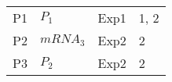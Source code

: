 

\begin{center}
\label{3_node_prediction}
\begin{scriptsize}
\begin{supertabular}{|p{2cm}|p{3cm}|p{3cm}|p{3cm}|}  
\hline											
P1 &  $P_{1}$ & Exp1 & 1, 2 \\
P2 &  $mRNA_{3}$  & Exp2 & 2 \\
P3 &  $P_{2}$ & Exp2 & 2 \\
\hline
\end{supertabular}
\end{scriptsize}
\end{center}
%
